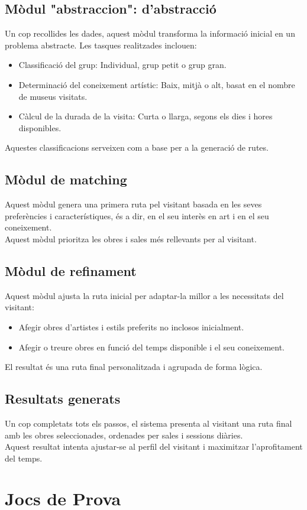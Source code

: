 \documentclass[a4paper]{article}
\begin{document}
	
	\subsection{Mòdul "abstraccion": d’abstracció}
	
	Un cop recollides les dades, aquest mòdul transforma la informació inicial en un problema abstracte. Les tasques realitzades inclouen:
	\begin{itemize}
		\item Classificació del grup: Individual, grup petit o grup gran.
		\item Determinació del coneixement artístic: Baix, mitjà o alt, basat en el nombre de museus visitats.
		\item Càlcul de la durada de la visita: Curta o llarga, segons els dies i hores disponibles.
	\end{itemize}
	Aquestes classificacions serveixen com a base per a la generació de rutes.
	
	\subsection{Mòdul de matching}
	
	Aquest mòdul genera una primera ruta pel visitant basada en les seves preferències i característiques, és a dir, en el seu interès en art i en el seu coneixement. \\
	
	Aquest mòdul prioritza les obres i sales més rellevants per al visitant.
	
	\subsection{Mòdul de refinament}
	
	Aquest mòdul ajusta la ruta inicial per adaptar-la millor a les necessitats del visitant:
	\begin{itemize}
		\item Afegir obres d'artistes i estils preferits no inclosos inicialment.
		\item Afegir o treure obres en funció del temps disponible i el seu coneixement.
	\end{itemize}
	El resultat és una ruta final personalitzada i agrupada de forma lògica.
	
	\subsection{Resultats generats}
	
	Un cop completats tots els passos, el sistema presenta al visitant una ruta final amb les obres seleccionades, ordenades per sales i sessions diàries. \\
	
	Aquest resultat intenta ajustar-se al perfil del visitant i maximitzar l’aprofitament del temps.
	
	
	\newpage
	\section{Jocs de Prova}
	
\end{document}
